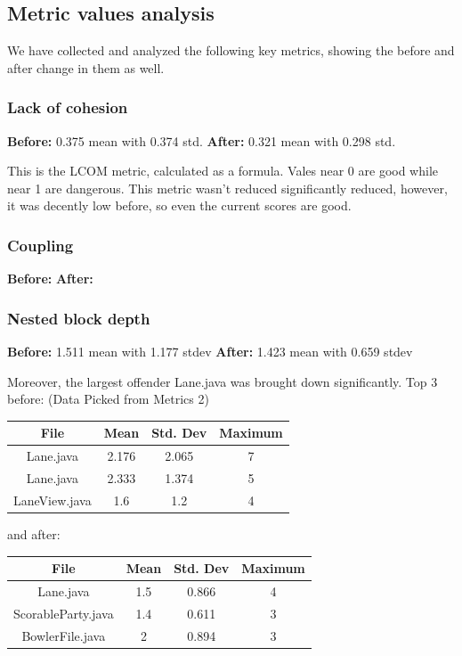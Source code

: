 \subsection{Metric values analysis}

We have collected and analyzed the following key metrics, showing the before and after change in them as well.

\subsubsection{Lack of cohesion}

\textbf{Before:} 0.375 mean with 0.374 std.
\textbf{After:} 0.321 mean with 0.298 std.

This is the LCOM metric, calculated as a formula. Vales near 0 are good while near 1 are dangerous. This metric wasn't reduced significantly reduced, however, it was decently low before, so even the current scores are good.

\subsubsection{Coupling}
\textbf{Before:}
\textbf{After:}

\subsubsection{Nested block depth}
\textbf{Before:} 1.511 mean with 1.177 stdev
\textbf{After:} 1.423 mean with 0.659 stdev

Moreover, the largest offender Lane.java was brought down significantly. Top 3 before:
(Data Picked from Metrics 2)

\begin{tabular}{ |c|c|c|c| }
    \hline
    \textbf{File} & \textbf{Mean} & \textbf{Std. Dev} & \textbf{Maximum} \\
    \hline
    Lane.java     & 2.176         & 2.065             & 7                \\
    Lane.java     & 2.333         & 1.374             & 5                \\
    LaneView.java & 1.6           & 1.2               & 4                \\
    \hline
\end{tabular}

and after:

\begin{tabular}{ |c|c|c|c| }
    \hline
    \textbf{File}      & \textbf{Mean} & \textbf{Std. Dev} & \textbf{Maximum} \\
    \hline
    Lane.java          & 1.5           & 0.866             & 4                \\
    ScorableParty.java & 1.4           & 0.611             & 3                \\
    BowlerFile.java    & 2             & 0.894             & 3                \\
    \hline
\end{tabular}

